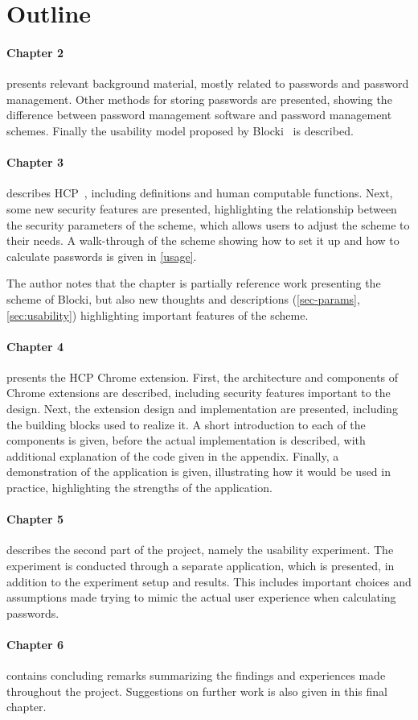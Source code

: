 \section{Outline}
\paragraph{Chapter 2} presents relevant background material, mostly related to passwords and password management. Other methods for storing passwords are presented, showing the difference between password management software and password management schemes. Finally the usability model proposed by Blocki~\cite{Blocki2014} is described.
\paragraph{Chapter 3} describes HCP~\cite{hcp-blocki}, including definitions and human computable functions. Next, some new security features are presented, highlighting the relationship between the security parameters of the scheme, which allows users to adjust the scheme to their needs. A walk-through of the scheme showing how to set it up and how to calculate passwords is given in \autoref{usage}.
\par The author notes that the chapter is partially reference work presenting the scheme of Blocki, but also new thoughts and descriptions (\autoref{sec-params}, \autoref{sec:usability}) highlighting important features of the scheme. 
\paragraph{Chapter 4} presents the HCP Chrome extension. First, the architecture and components of Chrome extensions are described, including security features important to the design. Next, the extension design and implementation are presented, including the building blocks used to realize it. A short introduction to each of the components is given, before the actual implementation is described, with additional explanation of the code given in the appendix. Finally, a demonstration of the application is given, illustrating how it would be used in practice, highlighting the strengths of the application.
\paragraph{Chapter 5} describes the second part of the project, namely the usability experiment. The experiment is conducted through a separate application, which is presented, in addition to the experiment setup and results. This includes important choices and assumptions made trying to mimic the actual user experience when calculating passwords.
\paragraph{Chapter 6} contains concluding remarks summarizing the findings and experiences made throughout the project. Suggestions on further work is also given in this final chapter.


